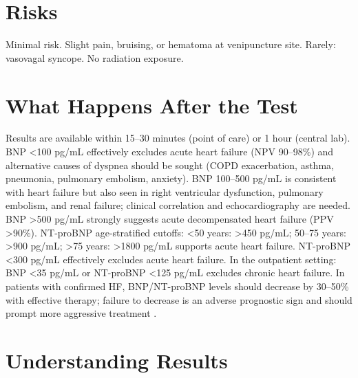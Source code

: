 \section*{Risks}
Minimal risk. Slight pain, bruising, or hematoma at venipuncture site. Rarely: vasovagal syncope. No radiation exposure.

\section*{What Happens After the Test}
Results are available within 15--30 minutes (point of care) or 1 hour (central lab). BNP <100 pg/mL effectively excludes acute heart failure (NPV 90--98\%) and alternative causes of dyspnea should be sought (COPD exacerbation, asthma, pneumonia, pulmonary embolism, anxiety). BNP 100--500 pg/mL is consistent with heart failure but also seen in right ventricular dysfunction, pulmonary embolism, and renal failure; clinical correlation and echocardiography are needed. BNP >500 pg/mL strongly suggests acute decompensated heart failure (PPV >90\%). NT-proBNP age-stratified cutoffs: <50 years: >450 pg/mL; 50--75 years: >900 pg/mL; >75 years: >1800 pg/mL supports acute heart failure. NT-proBNP <300 pg/mL effectively excludes acute heart failure. In the outpatient setting: BNP <35 pg/mL or NT-proBNP <125 pg/mL excludes chronic heart failure. In patients with confirmed HF, BNP/NT-proBNP levels should decrease by 30--50\% with effective therapy; failure to decrease is an adverse prognostic sign and should prompt more aggressive treatment \cite{mueller2019heart}.

\section*{Understanding Results}

